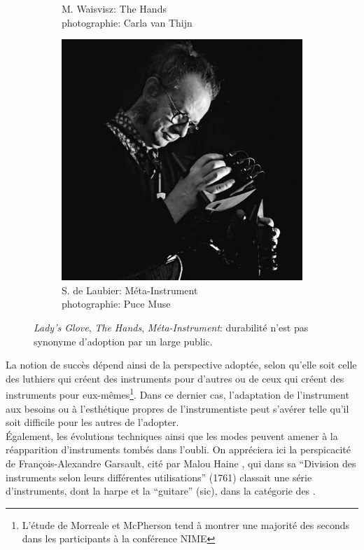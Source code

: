 \begin{figure}[!htbp]
{\begin{subfigure}[b]{.35\textwidth}
			\caption[Michel Waisvisz et The Hands v2]{M. Waisvisz: The Hands\\ photographie: Carla van Thijn}
			\label{fig:ephemeral:Waisvisz_TheHands}
		\end{subfigure}%
		\begin{subfigure}[b]{.35\textwidth}
			\centering
			\includegraphics[width=.98\textwidth]{gfx/02_ephemeral/DeLaubier-MI4.jpg}
			\caption[Serge de Laubier et le Méta-Instrument 4]{S. de Laubier: Méta-Instrument\\ photographie: Puce Muse}
			\label{fig:ephemeral:DeLaubier_MI4}
		\end{subfigure}%
	}
	\caption[Lady's Glove, The Hands, Méta-Instrument: durabilité n'est pas synonyme d'adoption]{\textit{Lady's Glove}, \textit{The Hands}, \textit{Méta-Instrument}: durabilité n'est pas synonyme d'adoption par un large public.}
\end{figure}
\indent La notion de succès dépend ainsi de la perspective adoptée, selon qu'elle soit celle des luthiers qui créent des instruments pour d'autres ou de ceux qui créent des instruments pour eux-mêmes\footnote{L'étude de Morreale et McPherson \cite{morreale_design_2017} tend à montrer une majorité des seconds dans les participants à la conférence \gls{NIME}}. Dans ce dernier cas, l'adaptation de l'instrument aux besoins ou à l'esthétique propres de l'instrumentiste peut s'avérer telle qu'il soit difficile pour les autres de l'adopter.\\
\indent Également, les évolutions techniques ainsi que les modes peuvent amener à la réapparition d'instruments tombés dans l'oubli. On appréciera ici la perspicacité de François-Alexandre Garsault, cité par Malou Haine \cite{haine_les_2018}, qui dans sa ``Division des instruments selon leurs différentes utilisations'' (1761) classait une série d'instruments, dont la harpe et la ``guitare'' (sic), dans la catégorie des .


